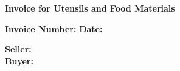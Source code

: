 \documentclass[a4paper]{article}
\begin{document}
\begin{center}
  {\LARGE \textbf{Invoice for Utensils and Food Materials}}
\end{center}

\vspace{0.5cm}

\noindent \textbf{Invoice Number:} \underline{\hspace{5cm}} \hfill \textbf{Date:} \underline{\hspace{5cm}}

\vspace{0.5cm}

\noindent \textbf{Seller:} \underline{\hspace{10cm}}\\
\noindent \textbf{Buyer:} \underline{\hspace{10cm}}

\vspace{1cm}
\end{document}
